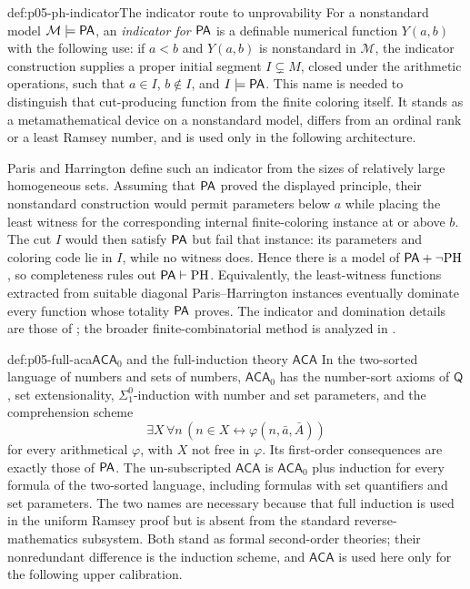 \begin{hbmethod}{def:p05-ph-indicator}{The indicator route to unprovability}
For a nonstandard model \(\mathcal M\models\mathsf{PA}\), an \emph{indicator for
\(\mathsf{PA}\)} is a definable numerical function \(Y(a,b)\) with the following use:
if \(a<b\) and \(Y(a,b)\) is nonstandard in \(\mathcal M\), the indicator
construction supplies a proper initial segment \(I\subsetneq M\), closed under
the arithmetic operations, such that \(a\in I\), \(b\notin I\), and
\(I\models\mathsf{PA}\).  This name is needed to distinguish that cut-producing
function from the finite coloring itself.  It stands as a metamathematical
device on a nonstandard model, differs from an ordinal rank or a least Ramsey
number, and is used only in the following architecture.

Paris and Harrington define such an indicator from the sizes of relatively
large homogeneous sets.  Assuming that \(\mathsf{PA}\) proved the displayed principle,
their nonstandard construction would permit parameters below \(a\) while
placing the least witness for the corresponding internal finite-coloring
instance at or above \(b\).  The cut \(I\) would then satisfy \(\mathsf{PA}\) but fail
that instance: its parameters and coloring code lie in \(I\), while no witness
does.  Hence there is a model of \(\mathsf{PA}+\neg\mathrm{PH}\), so completeness
rules out \(\mathsf{PA}\vdash\mathrm{PH}\).  Equivalently, the least-witness
functions extracted from suitable diagonal Paris--Harrington instances
eventually dominate every function whose totality \(\mathsf{PA}\) proves.  The
indicator and domination details are those of
\cite{ParisHarrington1977}; the broader finite-combinatorial method is
analyzed in \cite{KanamoriMcAloon1987}.
\end{hbmethod}

\begin{hbdefinition}{def:p05-full-aca}{\(\mathsf{ACA}_0\) and the full-induction theory \(\mathsf{ACA}\)}
In the two-sorted language of numbers and sets of numbers,
\(\mathsf{ACA}_0\) has the number-sort axioms of \(\mathsf Q\), set
extensionality, \(\Sigma^0_1\)-induction with number and set parameters, and
the comprehension scheme
\[
 \exists X\,\forall n\,(n\in X\leftrightarrow\varphi(n,\bar a,\bar A))
\]
for every arithmetical \(\varphi\), with \(X\) not free in \(\varphi\).
Its first-order consequences are exactly those of \(\mathsf{PA}\).
The un-subscripted \(\mathsf{ACA}\) is \(\mathsf{ACA}_0\) plus induction for
every formula of the two-sorted language, including formulas with set
quantifiers and set parameters.  The two names are necessary because that
full induction is used in the uniform Ramsey proof but is absent from the
standard reverse-mathematics subsystem.  Both stand as formal second-order
theories; their nonredundant difference is the induction scheme, and
\(\mathsf{ACA}\) is used here only for the following upper calibration.
\end{hbdefinition}

